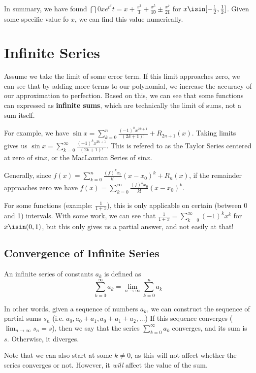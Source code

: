 \documentclass[12pt]{article}
\begin{document}
In summary, we have found $\dint{0}{x}{e^{t^2}}{t} = x + \frac{x^3}{3} + \frac{x^5}{10} \pm \frac{x^7}{21}$ for $x \isin [-\frac{1}{2},\frac{1}{2}]$. Given some specific value fo $x$, we can find this value numerically.

\section*{Infinite Series}
Assume we take the limit of some error term. If this limit approaches zero, we can see that by adding more terms to our polynomial, we increase the accuracy of our approximation to perfection. Based on this, we can see that some functions can expressed as {\bf infinite sums}, which are technically the limit of sums, not a sum itself.

For example, we have $\sin x = \displaystyle\sum_{k=0}^n \frac{(-1)^k x^{2k+1}}{(2k+1)!} + R_{2n+1}(x)$. Taking limits gives us $\sin x = \displaystyle\sum_{k=0}^\infty \frac{(-1)^k x^{2k+1}}{(2k+1)!}$. This is refered to as the Taylor Series centered at zero of sin$x$, or the MacLaurian Series of sin$x$.

Generally, since $f(x) = \displaystyle\sum_{k=0}^n \frac{(f)^k x_0}{k!}(x - x_0)^k + R_n(x)$, if the remainder approaches zero we have $f(x) = \displaystyle\sum_{k=0}^\infty \frac{(f)^k x_0}{k!}(x - x_0)^k$.

For some functions (example: $\frac{1}{1+x}$), this is only applicable on certain (between 0 and 1) intervals. With some work, we can see that $\frac{1}{1+x} = \displaystyle\sum_{k=0}^\infty (-1)^kx^k$ for $x \isin (0,1)$, but this only gives us a partial answer, and not easily at that!

\subsection*{Convergence of Infinite Series}
 An infinite series of constants $a_k$ is defined as \[ \sum_{k=0}^\infty a_k = \lim_{n\to\infty} \sum_{k=0}^n a_k \]

In other words, given a sequence of numbers $a_k$, we can construct the sequence of partial sums $s_n$ (i.e. $a_0, a_0 + a_1, a_0 + a_1 + a_2, ...$) If this sequence converges ($\lim_{n\to\infty} s_n = s$), then we say that the series $\displaystyle\sum_{k=0}^\infty a_k$ converges, and its sum is $s$. Otherwise, it diverges.

Note that we can also start at some $k \neq 0$, as this will not affect whether the series converges or not. However, it \emph{will} affect the value of the sum.
\end{document}
